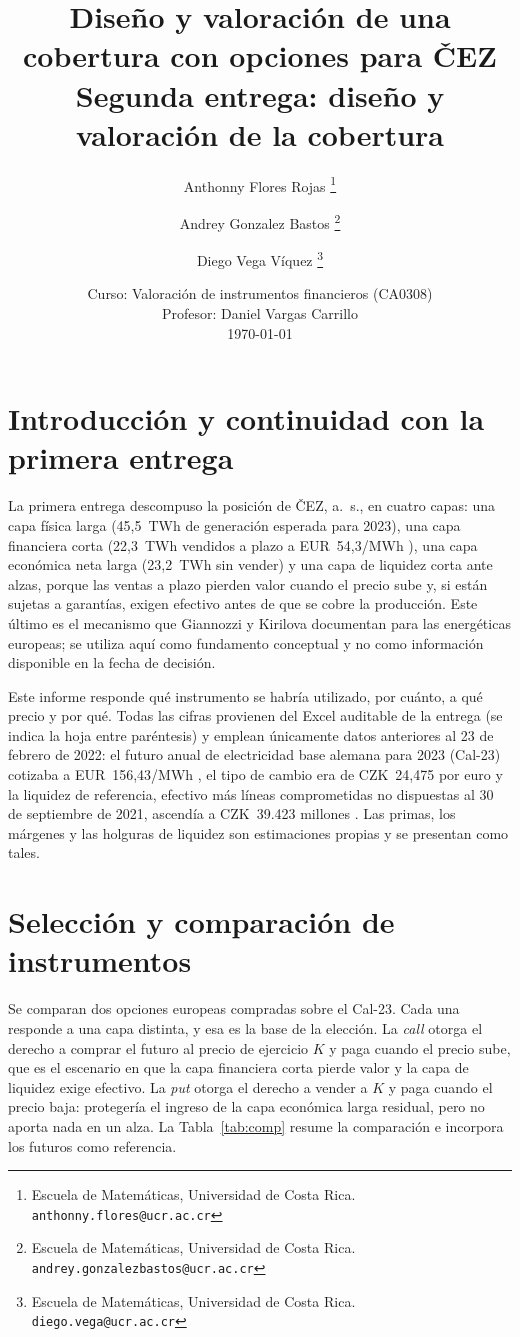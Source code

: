 \documentclass[11pt,letterpaper]{article}
\title{
    \textbf{Diseño y valoración de una cobertura con opciones para ČEZ}\\[0.4em]
    \large Segunda entrega: diseño y valoración de la cobertura
}
\author{%
    {Anthonny Flores Rojas}
    \thanks{
        Escuela de Matemáticas,
        Universidad de Costa Rica.
        \texttt{anthonny.flores@ucr.ac.cr}
    }
    \and
    {Andrey Gonzalez Bastos}
    \thanks{
        Escuela de Matemáticas,
        Universidad de Costa Rica.
        \texttt{andrey.gonzalezbastos@ucr.ac.cr}
    }
    \and
    {Diego Vega Víquez}
    \thanks{
        Escuela de Matemáticas,
        Universidad de Costa Rica.
        \texttt{diego.vega@ucr.ac.cr}
    }
}
\date{
    Curso: Valoración de instrumentos financieros (CA0308)\\
    Profesor: Daniel Vargas Carrillo\\[0.3em]
    \today
}
\theoremstyle{plain}
\theoremstyle{definition}
\theoremstyle{remark}
\numberwithin{equation}{section}
\begin{document}
\maketitle

\tableofcontents

\newpage

\section{Introducción y continuidad con la primera entrega}

La primera entrega descompuso la posición de ČEZ, a.~s., en cuatro capas: una capa física larga (45,5~TWh de generación esperada para 2023), una capa financiera corta (22,3~TWh vendidos a plazo a EUR~54,3/MWh \cite{cez_q3_2021}), una capa económica neta larga (23,2~TWh sin vender) y una capa de liquidez corta ante alzas, porque las ventas a plazo pierden valor cuando el precio sube y, si están sujetas a garantías, exigen efectivo antes de que se cobre la producción. Este último es el mecanismo que Giannozzi y Kirilova \cite{GIANNOZZI2026107700} documentan para las energéticas europeas; se utiliza aquí como fundamento conceptual y no como información disponible en la fecha de decisión.

Este informe responde qué instrumento se habría utilizado, por cuánto, a qué precio y por qué. Todas las cifras provienen del Excel auditable de la entrega (se indica la hoja entre paréntesis) y emplean únicamente datos anteriores al 23 de febrero de 2022: el futuro anual de electricidad base alemana para 2023 (Cal-23) cotizaba a EUR~156,43/MWh \cite{energycharts_futuros_de}, el tipo de cambio era de CZK~24,475 por euro \cite{cnbfx} y la liquidez de referencia, efectivo más líneas comprometidas no dispuestas al 30 de septiembre de 2021, ascendía a CZK~39.423 millones \cite{cez_interim_q3_2021,cez_q3_2021}. Las primas, los márgenes y las holguras de liquidez son estimaciones propias y se presentan como tales.

\section{Selección y comparación de instrumentos}

Se comparan dos opciones europeas compradas sobre el Cal-23. Cada una responde a una capa distinta, y esa es la base de la elección. La \emph{call} otorga el derecho a comprar el futuro al precio de ejercicio $K$ y paga cuando el precio sube, que es el escenario en que la capa financiera corta pierde valor y la capa de liquidez exige efectivo. La \emph{put} otorga el derecho a vender a $K$ y paga cuando el precio baja: protegería el ingreso de la capa económica larga residual, pero no aporta nada en un alza. La Tabla~\ref{tab:comp} resume la comparación e incorpora los futuros como referencia.
\end{document}
